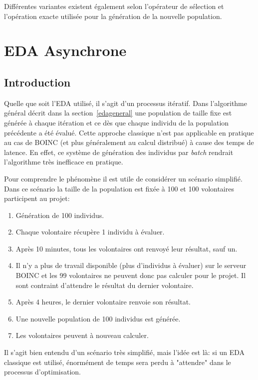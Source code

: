 \documentclass[a4paper, 11pt]{report}
\begin{document}
Différentes variantes existent également selon l'opérateur de sélection et l'opération exacte utilisée pour la génération de la nouvelle population.

\section{EDA Asynchrone}
\label{edaasynch}
\subsection{Introduction}
Quelle que soit l'EDA utilisé, il s'agit d'un processus itératif. Dans l'algorithme général décrit dans la section~\ref{edageneral} une population de taille fixe est générée à chaque itération et ce dès que chaque individu de la population précédente a été évalué. Cette approche classique n'est pas applicable en pratique au cas de \textsc{BOINC} (et plus généralement au calcul distribué) à cause des temps de latence. En effet, ce système de génération des individus par \textit{batch} rendrait l'algorithme très inefficace en pratique.

Pour comprendre le phénomène il est utile de considérer un scénario simplifié. Dans ce scénario la taille de la population est fixée à 100 et 100 volontaires participent au projet:
\begin{enumerate}[1)]
\item Génération de 100 individus.
\item Chaque volontaire récupère 1 individu à évaluer.
\item Après 10 minutes, tous les volontaires ont renvoyé leur résultat, sauf un.
\item Il n'y a plus de travail disponible (plus d'individus à évaluer) sur le serveur \textsc{BOINC} et les 99 volontaires ne peuvent donc pas calculer pour le projet. Il sont contraint d'attendre le résultat du dernier volontaire.
\item Après 4 heures, le dernier volontaire renvoie son résultat.
\item Une nouvelle population de 100 individus est générée.
\item Les volontaires peuvent à nouveau calculer.
\end{enumerate}
Il s'agit bien entendu d'un scénario très simplifié, mais l'idée est là: si un EDA classique est utilisé, énormément de temps sera perdu à "attendre" dans le processus d'optimisation. 
\end{document}
